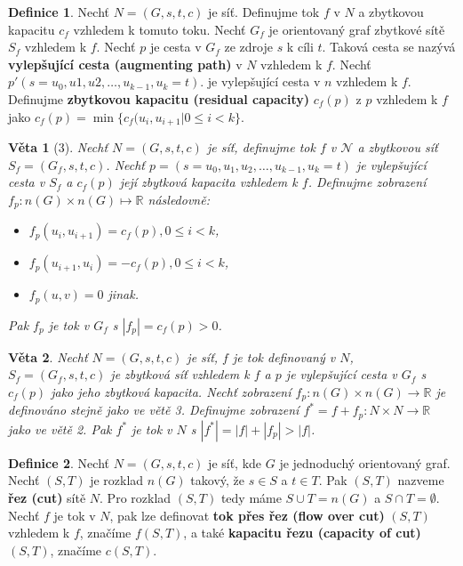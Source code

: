 \documentclass[a4]{report}
\newtheorem{theorem}{Věta}
\theoremstyle{definition}
\newtheorem{definition}{Definice}[section]
\begin{document}
\begin{definition}
Nechť $N = (G, s, t, c)$ je síť. Definujme tok $f$ v $N$ a zbytkovou kapacitu $c_f$ vzhledem k tomuto toku. Nechť $G_f$ je orientovaný graf zbytkové sítě $S_f$ vzhledem k $f$. Nechť $p$ je cesta v $G_f$ ze zdroje $s$ k cíli $t$. Taková cesta se nazývá \textbf{vylepšující cesta (augmenting path)} v $N$ vzhledem k $f$. Nechť $p '(s = u_0, u1, u2, \ldots, u_{k-1}, u_k = t)$. je vylepšující cesta v $n$ vzhledem k $f$. Definujme \textbf{zbytkovou kapacitu (residual capacity)} $c_f (p)$ z $p$ vzhledem k $f$ jako $c_f (p) = \min \{ c_f (u_i, u_{i+1} | 0 \leq i  < k\}$.
\end{definition}

\begin{theorem}[3]
Nechť $N=(G,s,t,c)$ je síť, definujme tok $f$  v $\mathcal{N}$ a zbytkovou síť $S_f=(G_f,s,t,c)$. Nechť
$p=(s=u_0,u_1,u_2,\ldots,u_{k-1},u_k=t)$ je vylepšující cesta v $S_f$ a $c_f(p)$ její zbytková kapacita vzhledem k $f$. Definujme zobrazení $f_p: n(G)\times n(G)\mapsto \mathbb{R}$ následovně:
\begin{itemize}
    \item $f_p(u_i,u_{i+1})=c_f(p),0 \leq i < k$,
    \item $f_p(u_{i+1},u_i)=-c_f(p),0 \leq i < k$,
    \item $f_p(u,v)=0$ jinak.
\end{itemize}
Pak $f_p$ je tok v $G_f$ s $|f_p|=c_f(p) > 0$.
\end{theorem}

\begin{theorem}
Nechť $N=(G,s,t,c)$ je síť, $f$ je tok definovaný v $N$, $S_f=(G_f,s,t,c)$ je zbytková síť vzhledem k $f$ a $p$ je vylepšující cesta v $G_f$ s $c_f (p)$ jako jeho zbytková kapacita. Nechť zobrazení $f_p : n(G) \times n(G) \rightarrow \mathbb{R}$ je definováno stejně jako ve větě 3. Definujme zobrazení $f^{*} = f + f_p : N \times N \rightarrow \mathbb{R}$ jako ve větě 2. Pak $f^{*}$ je tok v $N$ s $ | f^{*} | = |f| + |f_p | > | f |$.
\end{theorem}

\begin{definition}
    Nechť $N=(G,s,t,c)$ je síť, kde $G$ je jednoduchý orientovaný graf. Nechť $(S,T)$ je rozklad $n(G)$ takový, že $s \in S$ a $t \in T$. Pak $(S,T)$ nazveme \textbf{řez (cut)} sítě $N$. Pro rozklad $(S,T)$ tedy máme $S \cup T = n(G)$ a $S \cap T = \emptyset$. Nechť $f$ je tok v $N$, pak lze definovat \textbf{tok přes řez (flow over cut)} $(S,T)$ vzhledem k $f$, značíme $f(S,T)$, a také \textbf{kapacitu řezu (capacity of cut)} $(S,T)$, značíme $c(S,T)$.
\end{definition}
\end{document}
